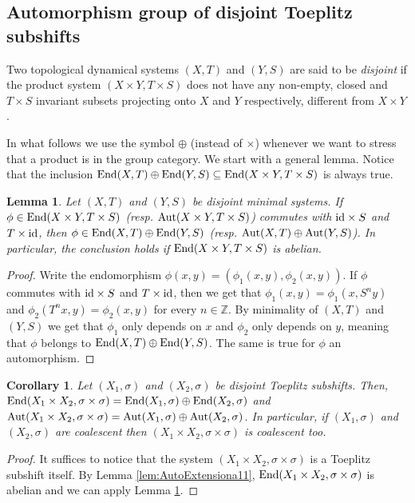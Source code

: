 \documentclass{daj}
\theoremstyle{plain}
\newtheorem{lemma}[theorem]{Lemma}
\newtheorem{corollary}[theorem]{Corollary}
\theoremstyle{definition}
\begin{document}
\subsection{Automorphism group of disjoint Toeplitz subshifts}
Two topological dynamical systems $(X,T)$ and $(Y,S)$ are said to be \emph{disjoint} if the product system $(X\times Y,T\times S)$ does not have any non-empty, closed and $T\times S$ invariant subsets projecting onto $X$ and $Y$ respectively, different from $X\times Y$. 

In what follows we use the symbol $\oplus$ (instead of $\times$) whenever we want to stress that a product is in the group category. We start with a general lemma.
Notice that the inclusion ${\rm End}(X,T)\oplus {\rm End}(Y,S) \subseteq {\rm End}(X\times Y,T\times S)$ is always true.


\begin{lemma} \label{Lemma:AutoProduct}
	Let $(X,T)$ and $(Y,S)$ be disjoint minimal systems. If $ \phi \in{\rm End}(X\times Y,T\times S)$ (resp. ${\rm Aut}(X\times Y,T\times S)$) commutes with  ${\rm id} \times S$ and $T\times {\rm id}$, then $\phi \in {\rm End}(X,T)\oplus {\rm End}(Y,S)$ (resp. $ {\rm Aut}(X,T)\oplus {\rm Aut}(Y,S)$). In particular, the conclusion holds if  ${\rm End}(X\times Y,T\times S)$ is abelian. 
\end{lemma}
\begin{proof}
	Write the  endomorphism $\phi(x,y)=(\phi_1(x,y),\phi_2(x,y))$. If $\phi$ commutes with ${\rm id} \times S$ and $T\times {\rm id}$, then we get that $\phi_1(x,y)=\phi_1(x,S^n y)$ and $\phi_2(T^nx,y)=\phi_2(x,y)$ for every $n\in \mathbb{Z}$. By minimality of $(X,T)$ and $(Y,S)$ we get that  $\phi_1$ only depends on $x$ and $\phi_2$ only depends on $y$, meaning that $\phi$ belongs to ${\rm End}(X,T)\oplus {\rm End}(Y,S)$. The same is true for $\phi$ an automorphism.  
\end{proof}

\begin{corollary} \label{Corollary:AutoProductToeplitz}
	Let $(X_1,\sigma)$ and $(X_2,\sigma)$ be disjoint Toeplitz subshifts. Then, ${\rm End}(X_1 \times X_2,\sigma \times \sigma) = {\rm End}(X_1, \sigma)\oplus {\rm End}(X_2,\sigma)$  and ${\rm Aut}(X_1 \times X_2,\sigma \times \sigma) = {\rm Aut}(X_1, \sigma)\oplus {\rm Aut}(X_2,\sigma)$. In particular, if $(X_1,\sigma)$ and $(X_2,\sigma)$ are coalescent then $(X_1\times X_2,\sigma\times \sigma)$ is coalescent too.
\end{corollary}
\begin{proof}
	It suffices to notice that the system $(X_1 \times X_2, \sigma\times \sigma)$ is a Toeplitz subshift itself. By Lemma \ref{lem:AutoExtensiona11}, ${\rm End}(X_1 \times X_2,\sigma \times \sigma)$ is abelian and we can apply Lemma \ref{Lemma:AutoProduct}. 
\end{proof}
\end{document}
